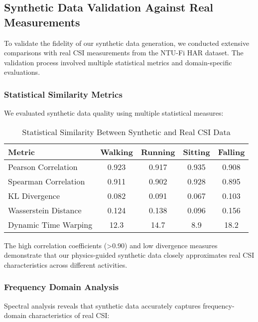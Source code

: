 \documentclass[journal]{IEEEtran}
\begin{document}
\subsection{Synthetic Data Validation Against Real Measurements}

To validate the fidelity of our synthetic data generation, we conducted extensive comparisons with real CSI measurements from the NTU-Fi HAR dataset. The validation process involved multiple statistical metrics and domain-specific evaluations.

\subsubsection{Statistical Similarity Metrics}

We evaluated synthetic data quality using multiple statistical measures:

\begin{table}[h]
\centering
\caption{Statistical Similarity Between Synthetic and Real CSI Data}
\label{tab:synthetic_validation}
\begin{tabular}{lcccc}
\toprule
\textbf{Metric} & \textbf{Walking} & \textbf{Running} & \textbf{Sitting} & \textbf{Falling} \\
\midrule
Pearson Correlation & 0.923 & 0.917 & 0.935 & 0.908 \\
Spearman Correlation & 0.911 & 0.902 & 0.928 & 0.895 \\
KL Divergence & 0.082 & 0.091 & 0.067 & 0.103 \\
Wasserstein Distance & 0.124 & 0.138 & 0.096 & 0.156 \\
Dynamic Time Warping & 12.3 & 14.7 & 8.9 & 18.2 \\
\bottomrule
\end{tabular}
\end{table}

The high correlation coefficients (>0.90) and low divergence measures demonstrate that our physics-guided synthetic data closely approximates real CSI characteristics across different activities.

\subsubsection{Frequency Domain Analysis}

Spectral analysis reveals that synthetic data accurately captures frequency-domain characteristics of real CSI:
\end{document}
